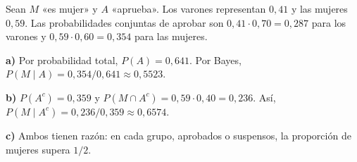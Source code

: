 Sean $M$ «es mujer» y $A$ «aprueba». Los varones representan $0{,}41$ y las mujeres $0{,}59$. Las probabilidades conjuntas de aprobar son $0{,}41\cdot0{,}70=0{,}287$ para los varones y $0{,}59\cdot0{,}60=0{,}354$ para las mujeres.

\textbf{a)} Por probabilidad total, $P(A)=0{,}641$. Por Bayes, $P(M\mid A)=0{,}354/0{,}641\approx\boxed{0{,}5523}$.

\textbf{b)} $P(A^c)=0{,}359$ y $P(M\cap A^c)=0{,}59\cdot0{,}40=0{,}236$. Así, $P(M\mid A^c)=0{,}236/0{,}359\approx\boxed{0{,}6574}$.

\textbf{c)} Ambos tienen razón: en cada grupo, aprobados o suspensos, la proporción de mujeres supera $1/2$.
